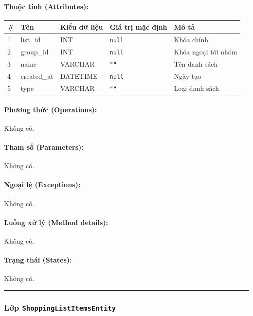 \documentclass[12pt,a4paper]{article}
\begin{document}
\paragraph{Thuộc tính (Attributes):}
\begin{longtable}{|p{0.6cm}|p{3.5cm}|p{2.4cm}|p{1.8cm}|p{5.1cm}|}
\hline
\textbf{\#} & \textbf{Tên} & \textbf{Kiểu dữ liệu} & \textbf{Giá trị mặc định} & \textbf{Mô tả} \\ \hline
\endhead
1 & list\_id & INT & \texttt{null} & Khóa chính \\ \hline
2 & group\_id & INT & \texttt{null} & Khóa ngoại tới nhóm \\ \hline
3 & name & VARCHAR & \texttt{""} & Tên danh sách \\ \hline
4 & created\_at & DATETIME & \texttt{null} & Ngày tạo \\ \hline
5 & type & VARCHAR & \texttt{""} & Loại danh sách \\ \hline
\end{longtable}

\paragraph{Phương thức (Operations):}
Không có.

\paragraph{Tham số (Parameters):}
Không có.

\paragraph{Ngoại lệ (Exceptions):}
Không có.

\paragraph{Luồng xử lý (Method details):}
Không có.

\paragraph{Trạng thái (States):}
Không có.

\vskip 0.5cm
\noindent\rule{\textwidth}{0.5pt}
\vskip 0.5cm

\subsubsection{Lớp \texttt{ShoppingListItemsEntity}}
\end{document}
